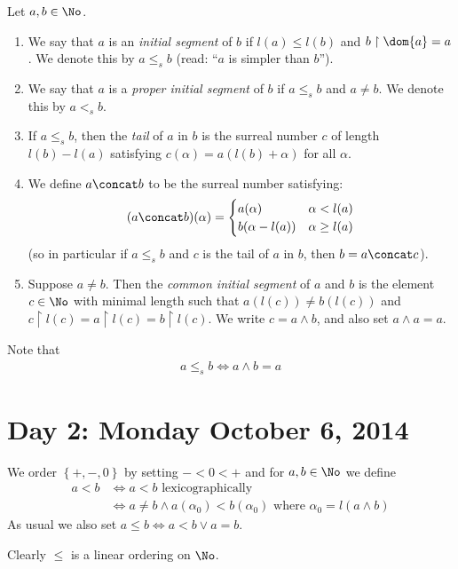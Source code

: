 \begin{defn}
	Let $a, b \in \No$. 
	\begin{enumerate}
		\item We say that $a$ is an \emph{initial segment} of 
			$b$ if $l(a) \leq l(b)$ and $b \restriction 
			\dom{a} = a$. We denote this by $a \leq_s b$
			(read: ``$a$ is simpler than $b$''). 
		\item We say that $a$ is a \emph{proper initial segment}
			of $b$ if $a \leq_s b$ and $a \neq b$. We denote 
			this by $a <_s b$. 
		\item If $a \leq_s b$, then the \emph{tail} of $a$ in 
			$b$ is the surreal number $c$ of length 
			$l(b) - l(a)$ satisfying $c(\alpha) = 
			a(l(b) + \alpha)$ for all $\alpha$. 
		\item We define $a \concat b$ to be the surreal number 
			satisfying: 
			\begin{align*}
				(a \concat b)(\alpha) = 
				\begin{cases}
					a(\alpha) & \alpha < l(a) \\
					b(\alpha - l(a)) & \alpha \geq l(a)
				\end{cases}
			\end{align*}
			(so in particular if $a \leq_s b$ and $c$ is the tail 
			of $a$ in $b$, then $b = a \concat c$). 
		\item Suppose $a \neq b$. Then the \emph{common initial 
			segment} of $a$ and $b$ is the element 
			$c \in \No$ with minimal length such that 
			$a(l(c)) \neq b(l(c))$ and $c \restriction l(c) 
			= a \restriction 
			l(c) = b \restriction l(c)$. We write 
			$c = a \wedge b$, and also set $a \wedge a = a$. 
	\end{enumerate}
\end{defn}
Note that 
\begin{align*}
	a \leq_s b \iff a \wedge b = a
\end{align*}

\section*{Day 2: Monday October 6, 2014}
\begin{defn}
	We order $\left\{ +, -, 0 \right\}$ by setting
	$- < 0 < +$ and for $a, b \in \No$ we define
	\begin{align*}
		a < b &\iff a < b \text{ lexicographically} \\
		&\iff a \neq b \land a(\alpha_0) < b(\alpha_0) 
		\text{ where } \alpha_0 = l(a \wedge b)
	\end{align*}
	As usual we also set $a \leq b \iff a < b \lor a = b$. 
\end{defn}
Clearly $\leq$ is a linear ordering on $\No$. 

